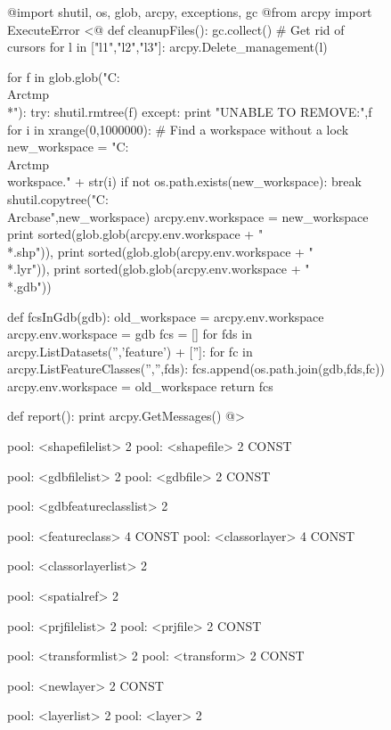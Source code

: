 \begin{figure}
{\scriptsize
\begin{code}
@import shutil, os, glob, arcpy, exceptions, gc
@from arcpy import ExecuteError
<@
def cleanupFiles():
    gc.collect() \# Get rid of cursors
    for l in ["l1","l2","l3"]:
    	arcpy.Delete\_management(l)
    
    for f in glob.glob("C:\\Arctmp\\*"):
        try:
            shutil.rmtree(f)
        except:
            print "UNABLE TO REMOVE:",f
    for i in xrange(0,1000000): \# Find a workspace without a lock
        new\_workspace = "C:\\Arctmp\\workspace." + str(i)
        if not os.path.exists(new\_workspace):
            break             
    shutil.copytree("C:\\Arcbase",new\_workspace)
    arcpy.env.workspace = new\_workspace
    print sorted(glob.glob(arcpy.env.workspace + "\\*.shp")),
    print sorted(glob.glob(arcpy.env.workspace + "\\*.lyr")),
    print sorted(glob.glob(arcpy.env.workspace + "\\*.gdb"))


def fcsInGdb(gdb):
    old\_workspace = arcpy.env.workspace
    arcpy.env.workspace = gdb
    fcs = []
    for fds in arcpy.ListDatasets('','feature') + ['']:
        for fc in arcpy.ListFeatureClasses('','',fds):
            fcs.append(os.path.join(gdb,fds,fc))
    arcpy.env.workspace = old\_workspace
    return fcs

def report():
    print arcpy.GetMessages()
@>

pool: <shapefilelist> 2
pool: <shapefile> 2 CONST

pool: <gdbfilelist> 2
pool: <gdbfile> 2 CONST

pool: <gdbfeatureclasslist> 2

pool: <featureclass> 4 CONST
pool: <classorlayer> 4 CONST

pool: <classorlayerlist> 2

pool: <spatialref> 2

pool: <prjfilelist> 2
pool: <prjfile> 2 CONST

pool: <transformlist> 2
pool: <transform> 2 CONST

pool: <newlayer> 2 CONST

pool: <layerlist> 2
pool: <layer> 2


\end{code}}
\end{figure}
